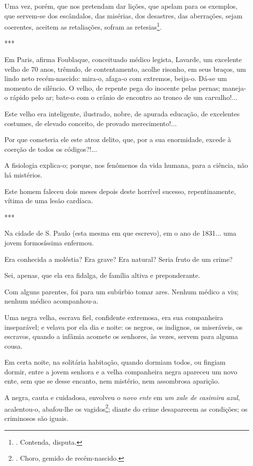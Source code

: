 Uma vez, porém, que nos pretendam dar lições, que apelam para os
exemplos, que servem-se dos escândalos, das misérias, dos desastres, das
aberrações, sejam coerentes, aceitem as retaliações, sofram as
retesias\footnote{. Contenda, disputa.}.

***

Em Paris, afirma Foublaque, conceituado médico legista, Lavarde, um
excelente velho de 70 anos, trêmulo, de contentamento, acolhe risonho,
em seus braços, um lindo neto recém-nascido: mira-o, afaga-o com
extremos, beija-o. Dá-se um momento de silêncio. O velho, de repente
pega do inocente pelas pernas; maneja-o rápido pelo ar; bate-o com o
crânio de encontro ao tronco de um carvalho!...

Este velho era inteligente, ilustrado, nobre, de apurada educação, de
excelentes costumes, de elevado conceito, de provado merecimento!...

Por que cometeria ele este atroz delito, que, por a sua enormidade,
excede à coerção de todos os códigos?!...

A fisiologia explica-o; porque, nos fenômenos da vida humana, para a
ciência, não há mistérios.

Este homem faleceu dois meses depois deste horrível sucesso,
repentinamente, vítima de uma lesão cardíaca.

***

Na cidade de S. Paulo (esta mesma em que escrevo), em o ano de 1831...
uma jovem formosíssima enfermou.

Era conhecida a moléstia? Era grave? Era natural? Seria fruto de um
crime?

Sei, apenas, que ela era fidalga, de família altiva e preponderante.

Com alguns parentes, foi para um subúrbio tomar ares. Nenhum médico a
viu; nenhum médico acompanhou-a.

Uma negra velha, escrava fiel, confidente extremosa, era sua companheira
inseparável; e velava por ela dia e noite: os negros, os indignos, os
miseráveis, os escravos, quando a infâmia acomete os senhores, às vezes,
servem para alguma cousa.

Em certa noite, na solitária habitação, quando dormiam todos, ou fingiam
dormir, entre a jovem senhora e a velha companheira negra apareceu um
novo ente, sem que se desse encanto, nem mistério, nem assombrosa
aparição.

A negra, cauta e cuidadosa, envolveu o \emph{novo ente} em \emph{um xale
de casimira azul}, acalentou-o, abafou-lhe os vagidos\footnote{. Choro,
  gemido de recém-nascido.}; diante do crime desaparecem as condições;
os criminosos são iguais.

